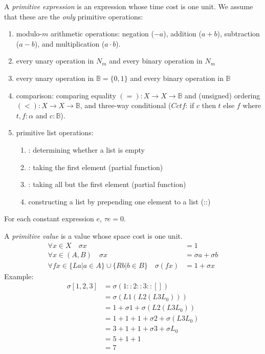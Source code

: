 A \emph{primitive expression} is an expression whose time cost is one unit.
We assume that these are the \emph{only} primitive operations:
\begin{enumerate}
    \item modulo-$m$ arithmetic operations:
            negation ($-a$),
            addition ($a + b$),
            subtraction ($a - b$),
            and multiplication ($a \cdot b$).
    \item every unary operation in $N_m$ and every binary operation in $N_m$
    \item every unary operation in $\mathbb B = \{0,1\}$ and every binary operation in $\mathbb B$
    \item comparison: comparing equality $(=) : X \to X \to \mathbb B$
        and (unsigned) ordering $(<) : X \to X \to \mathbb B$,
        and three-way conditional ($Cctf$: if $c$ then $t$ else $f$ where $t,f:\alpha$ and $c:\mathbb B$).
    \item primitive list operations:
        \begin{enumerate}
            \item \fnull: determining whether a list is empty
            \item \fhead: taking the first element (partial function)
            \item \ftail: taking all but the first element (partial function)
            \item constructing a list by prepending one element to a list (::)
        \end{enumerate}
\end{enumerate}
For each constant expression $e$, $\tau e = 0$.

A \emph{primitive value} is a value whose space cost is one unit.
\begin{align}
    \forall x \in X \quad \sigma x &= 1
    \\ \forall x \in (A,B) \quad \sigma x &= \sigma a + \sigma b
     \\ \forall fx \in \{L a | a \in A\} \cup \{R b | b \in B\} \quad \sigma (fx) &= 1 + \sigma x
\end{align}
Example:
\begin{align}
    \sigma[1,2,3] &= \sigma(1::2::3::[])
               \\ &= \sigma (L1(L2(L3L_0)))
               \\ &= 1 + \sigma 1 + \sigma (L2(L3L_0))
               \\ &= 1 + 1 + 1 + \sigma 2 + \sigma (L3L_0)
               \\ &= 3 + 1 + 1 + \sigma 3 + \sigma L_0
               \\ &= 5 + 1 + 1
               \\ &= 7
\end{align}

